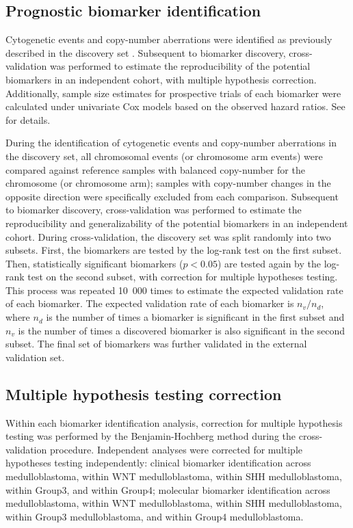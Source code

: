 \subsection{Prognostic biomarker identification}

Cytogenetic events and copy-number aberrations were identified as previously described in the discovery set . Subsequent to biomarker discovery, cross-validation was performed to estimate the reproducibility of the potential biomarkers in an independent cohort, with multiple hypothesis correction. Additionally, sample size estimates for prospective trials of each biomarker were calculated under univariate Cox models based on the observed hazard ratios. See  for details.

During the identification of cytogenetic events and copy-number aberrations in the discovery set, all chromosomal events (or chromosome arm events) were compared against reference samples with balanced copy-number for the chromosome (or chromosome arm); samples with copy-number changes in the opposite direction were specifically excluded from each comparison. Subsequent to biomarker discovery, cross-validation was performed to estimate the reproducibility and generalizability of the potential biomarkers in an independent cohort. During cross-validation, the discovery set was split randomly into two subsets. First, the biomarkers are tested by the log-rank test on the first subset. Then, statistically significant biomarkers ($p < 0.05$) are tested again by the log-rank test on the second subset, with correction for multiple hypotheses testing. This process was repeated 10~000 times to estimate the expected validation rate of each biomarker. The expected validation rate of each biomarker is $n_v / n_d$, where $n_d$ is the number of times a biomarker is significant in the first subset and $n_v$ is the number of times a discovered biomarker is also significant in the second subset. The final set of biomarkers was further validated in the external validation set.

\subsection{Multiple hypothesis testing correction}

Within each biomarker identification analysis, correction for multiple hypothesis testing was performed by the Benjamin-Hochberg method during the cross-validation procedure. Independent analyses were corrected for multiple hypotheses testing independently: clinical biomarker identification across medulloblastoma, within WNT medulloblastoma, within SHH medulloblastoma, within Group3, and within Group4; molecular biomarker identification across medulloblastoma, within WNT medulloblastoma, within SHH medulloblastoma, within Group3 medulloblastoma, and within Group4 medulloblastoma.

